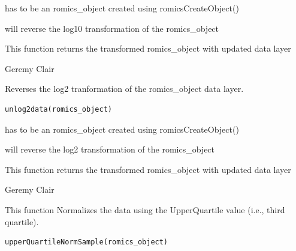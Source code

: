 \documentclass[a4paper]{book}
\begin{document}
%
\begin{Arguments}
\begin{ldescription}
\item[\code{romics\_object}] has to be an romics\_object created using romicsCreateObject()
\end{ldescription}
\end{Arguments}
%
\begin{Details}
will reverse the log10 transformation of the romics\_object
\end{Details}
%
\begin{Value}
This function returns the transformed romics\_object with updated data layer
\end{Value}
%
\begin{Author}
Geremy Clair
\end{Author}
%
\begin{Description}
Reverses the log2 tranformation of the romics\_object data layer.
\end{Description}
%
\begin{Usage}
\begin{verbatim}
unlog2data(romics_object)
\end{verbatim}
\end{Usage}
%
\begin{Arguments}
\begin{ldescription}
\item[\code{romics\_object}] has to be an romics\_object created using romicsCreateObject()
\end{ldescription}
\end{Arguments}
%
\begin{Details}
will reverse the log2 transformation of the romics\_object
\end{Details}
%
\begin{Value}
This function returns the transformed romics\_object with updated data layer
\end{Value}
%
\begin{Author}
Geremy Clair
\end{Author}
%
\begin{Description}
This function Normalizes the data using the UpperQuartile value (i.e., third quartile).
\end{Description}
%
\begin{Usage}
\begin{verbatim}
upperQuartileNormSample(romics_object)
\end{verbatim}
\end{Usage}
\end{document}
